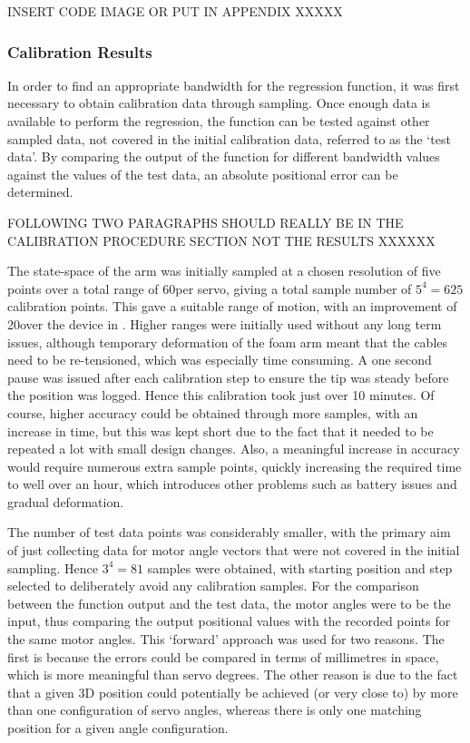 \documentclass[11pt]{article}
\begin{document}
INSERT CODE IMAGE OR PUT IN APPENDIX XXXXX	


\subsubsection{Calibration Results}
In order to find an appropriate bandwidth for the regression function, it was first necessary to obtain calibration data through sampling. Once enough data is available to perform the regression, the function can be tested against other sampled data, not covered in the initial calibration data, referred to as the `test data'. By comparing the output of the function for different bandwidth values against the values of the test data, an absolute positional error can be determined. 

FOLLOWING TWO PARAGRAPHS SHOULD REALLY BE IN THE CALIBRATION PROCEDURE SECTION NOT THE RESULTS XXXXXX

The state-space of the arm was initially sampled at a chosen resolution of five points over a total range of 60\degree per servo, giving a total sample number of $5^4 = 625$ calibration points. This gave a suitable range of motion, with an improvement of 20\degree over the device in \cite{GreggSmithDesign}. Higher ranges were initially used without any long term issues, although temporary deformation of the foam arm meant that the cables need to be re-tensioned, which was especially time consuming. A one second pause was issued after each calibration step to ensure the tip was steady before the position was logged. Hence this calibration took just over 10 minutes. Of course, higher accuracy could be obtained through more samples, with an increase in time, but this was kept short due to the fact that it needed to be repeated a lot with small design changes. Also, a meaningful increase in accuracy would require numerous extra sample points, quickly increasing the required time to well over an hour, which introduces other problems such as battery issues and gradual deformation. 

The number of test data points was considerably smaller, with the primary aim of just collecting data for motor angle vectors that were not covered in the initial sampling. Hence $3^4 = 81$ samples were obtained, with starting position and step selected to deliberately avoid any calibration samples. For the comparison between the function output and the test data, the motor angles were to be the input, thus comparing the output positional values with the recorded points for the same motor angles. This `forward' approach was used for two reasons. The first is because the errors could be compared in terms of millimetres in space, which is more meaningful than servo degrees. The other reason is due to the fact that a given 3D position could potentially be achieved (or very close to) by more than one configuration of servo angles, whereas there is only one matching position for a given angle configuration. 
\end{document}

